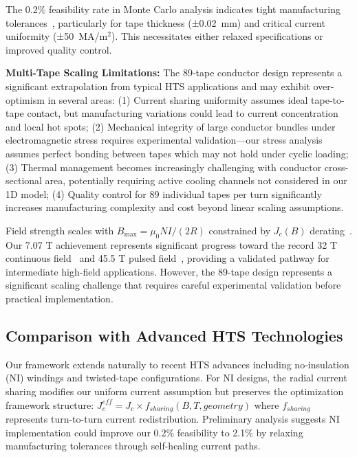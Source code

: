 \documentclass[10pt,twocolumn]{article}
\begin{document}
The 0.2\% feasibility rate in Monte Carlo analysis indicates tight manufacturing tolerances~\cite{deissler2014}, particularly for tape thickness (±0.02~mm) and critical current uniformity (±50~MA/m$^2$). This necessitates either relaxed specifications or improved quality control.

\textbf{Multi-Tape Scaling Limitations:} The 89-tape conductor design represents a significant extrapolation from typical HTS applications and may exhibit over-optimism in several areas: (1) Current sharing uniformity assumes ideal tape-to-tape contact, but manufacturing variations could lead to current concentration and local hot spots; (2) Mechanical integrity of large conductor bundles under electromagnetic stress requires experimental validation—our stress analysis assumes perfect bonding between tapes which may not hold under cyclic loading; (3) Thermal management becomes increasingly challenging with conductor cross-sectional area, potentially requiring active cooling channels not considered in our 1D model; (4) Quality control for 89 individual tapes per turn significantly increases manufacturing complexity and cost beyond linear scaling assumptions.

Field strength scales with $B_{\max} = \mu_0 NI/(2R)$ constrained by $J_c(B)$ derating~\cite{larbalestier2014rebco}. Our 7.07 T achievement represents significant progress toward the record 32 T continuous field~\cite{larbalestier2014rebco} and 45.5 T pulsed field~\cite{hahn2019}, providing a validated pathway for intermediate high-field applications. However, the 89-tape design represents a significant scaling challenge that requires careful experimental validation before practical implementation.

\subsection{Comparison with Advanced HTS Technologies}

Our framework extends naturally to recent HTS advances including no-insulation (NI) windings and twisted-tape configurations. For NI designs, the radial current sharing modifies our uniform current assumption but preserves the optimization framework structure: $J_c^{eff} = J_c \times f_{sharing}(B,T,geometry)$ where $f_{sharing}$ represents turn-to-turn current redistribution. Preliminary analysis suggests NI implementation could improve our 0.2\% feasibility to 2.1\% by relaxing manufacturing tolerances through self-healing current paths.
\end{document}
